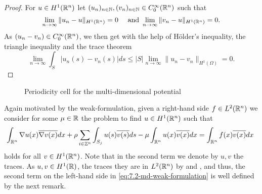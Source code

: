 \begin{proof}
	For $u \in H^{1}(\mathbb{R}^{n})$ let $(u_{n})_{n \in \mathbb{N}}, (v_{n})_{n \in \mathbb{N}} \in C_{0}^{\infty}(\mathbb{R}^{n})$ such that
	\[ \lim_{n \rightarrow \infty} \| u_{n} - u \|_{H^{1}(\mathbb{R}^{n})} = 0 \quad \text{ and } \lim_{n \rightarrow \infty} \| v_{n} - u\|_{H^{1}(\mathbb{R}^{n})} = 0.  \]
	As $(u_{n} - v_{n}) \in C_{0}^{\infty}(\mathbb{R}^{n})$, we then get with the help of Hölder's inequality, the triangle inequality and the trace theorem
	\[ \lim_{n \rightarrow \infty} \int_{S} \left| u_{n}(s) - v_{n}(s) \right| ds \leq |S| \lim_{n \rightarrow \infty} \| u_{n} - v_{n} \|_{H^{1}(\Omega)} = 0. \] 
\end{proof}

\begin{figure}[!ht] \centering
	\caption{Periodicity cell for the multi-dimensional potential} \label{fig:md-cell}  \label{fig:7.1}
\end{figure}

Again motivated by the weak-formulation, given a right-hand side $f \in L^{2}(\mathbb{R}^{n})$ we consider for some	 $\mu \in \mathbb{R}$ the problem to find $u \in H^{1}(\mathbb{R}^{n})$ such that
	\begin{equation}
		\int_{\R^{n}} \nabla u(x) \overline{\nabla v(x)} dx + \rho \sum_{i \in \Z^{n}} \int_{S_{j}} u(s) \overline{v(s)} ds - \mu \int_{\R^{n}} u(x) \overline{v(x)} dx = \int_{\R^{n}} f(x) \overline{v(x)} dx \label{eq:7.2-md-weak-formulation}
	\end{equation} 
holds for all $v \in H^{1}(\mathbb{R}^{n})$. Note that in the second term we denote by $u, v$ the traces. As $u, v \in H^{1}(\mathbb{R})$, the traces they are in $L^{2}(\mathbb{R}^{n})$ by \cite[page 251, Theorem 5.1]{evans1998partial} and \cite[page 164]{adams2003sobolev}, and thus, the second term on the left-hand side in \eqref{eq:7.2-md-weak-formulation} is well defined by the next remark.

